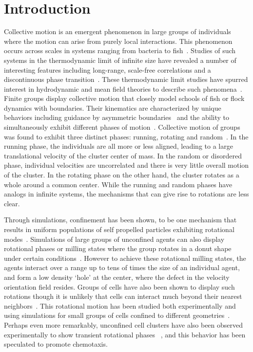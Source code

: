 \documentclass{article}
\begin{document}
\section*{Introduction}
Collective motion is an emergent phenomenon in large groups of individuals where the motion can arise from purely local interactions. This phenomenon occurs across scales in systems ranging from bacteria to fish~\cite{Couzin2003,Zafeiris}.  Studies of such systems in the thermodynamic limit of infinite size have revealed a number of interesting features including long-range, scale-free correlations and a discontinuous phase transition~\cite{Guillaume2004}. These thermodynamic limit studies have spurred interest in hydrodynamic and mean field theories to describe such phenomena~\cite{Toner2005}. Finite groups display collective motion that closely model schools of fish or flock dynamics with boundaries. Their kinematics are characterized by unique behaviors including guidance by asymmetric boundaries~\cite{Wan2008} and the ability to simultaneously exhibit different phases of motion~\cite{Copenhagen2016}. Collective motion of groups was found to exhibit three distinct phases: running, rotating and random~\cite{Tunstrom2013a,Cheng2016}. In the running phase, the individuals are all more or less aligned, leading to a large translational velocity of the cluster center of mass. In the random or disordered phase, individual velocities are uncorrelated and there is very little overall motion of the cluster. In the rotating phase on the other hand, the cluster rotates as a whole around a common center. While the running and random phases have analogs in infinite systems, the mechanisms that can give rise to rotations are less clear. 
 
Through simulations, confinement has been shown, to be one mechanism that results in uniform populations of self propelled particles exhibiting rotational modes~\cite{Szabo2006,Leong2013,Camley2014a,Lober2015}.  Simulations of large groups of unconfined agents can also display rotational phases or milling states where the group rotates in a donut shape under certain conditions~\cite{Levine2000,Erdmann2005a,Couzin2002,Chuang2006,Carrillo2014}.  However to achieve these rotational milling states, the agents interact over a range up to tens of times the size of an individual agent, and form a low density `hole' at the center, where the defect in the velocity orientation field resides. Groups of cells have also been shown to display such rotations though it is unlikely that cells can interact much beyond their nearest neighbors~\cite{Mehes2014,Tanner2012}. This rotational motion has been studied both experimentally and using simulations for small groups of cells confined to different geometries~\cite{Brangwynne2000,Doxzen2013,Li2014a,Segerer2015}. Perhaps even more remarkably, unconfined cell clusters have also been observed experimentally to show transient rotational phases ~\cite{Malet-Engra2014}, and this behavior has been speculated to promote chemotaxis.
\end{document}
